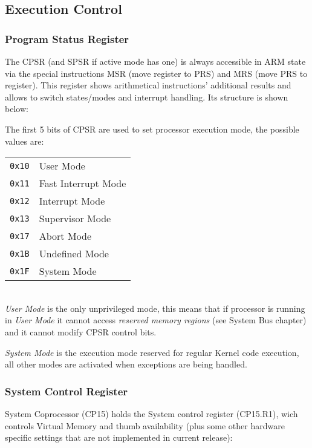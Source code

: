

\subsection{Execution Control}

\subsubsection{Program Status Register}

The CPSR (and SPSR if active mode has one) is always accessible in ARM state via the special instructions MSR (move register to PRS) and MRS (move PRS to register). This register shows arithmetical instructions' additional results and allows to switch states/modes and interrupt handling. Its structure is shown below:



The first 5 bits of CPSR are used to set processor execution mode, the possible values are:
\\

\begin{tabular}{r|l}
\texttt{0x10} & User Mode \\
\texttt{0x11} & Fast Interrupt Mode \\
\texttt{0x12} & Interrupt Mode \\
\texttt{0x13} & Supervisor Mode \\
\texttt{0x17} & Abort Mode \\
\texttt{0x1B} & Undefined Mode \\
\texttt{0x1F} & System Mode \\
\end{tabular}
\\

\emph{User Mode} is the only unprivileged mode, this means that if processor is running in \emph{User Mode} it cannot access \emph{reserved memory regions} (see System Bus chapter) and it cannot modify CPSR control bits.

\emph{System Mode} is the execution mode reserved for regular Kernel code execution, all other modes are activated when exceptions are being handled.

\subsubsection{System Control Register}

System Coprocessor (CP15) holds the System control register (CP15.R1), wich controls Virtual Memory and thumb availability (plus some other hardware specific settings that are not implemented in current release):

